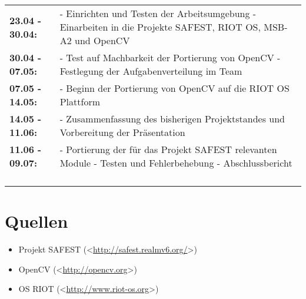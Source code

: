 \documentclass[10pt,a4paper]{article}
\begin{document}
\renewcommand{\arraystretch}{2}
\begin{tabularx}{\textwidth}{lX}
\textbf{23.04 - 30.04:} & 
- Einrichten und Testen der Arbeitsumgebung \newline
- Einarbeiten in die Projekte SAFEST, RIOT OS, MSB-A2 und OpenCV \\

\textbf{30.04 - 07.05:} & 
- Test auf Machbarkeit der Portierung von OpenCV \newline
- Festlegung der Aufgabenverteilung im Team \\

\textbf{07.05 - 14.05:} & 
- Beginn der Portierung von OpenCV auf die RIOT OS Plattform \\

\textbf{14.05 - 11.06:} & 
- Zusammenfassung des bisherigen Projektstandes und Vorbereitung der Präsentation \\

\textbf{11.06 - 09.07:} & 
- Portierung der für das Projekt SAFEST relevanten Module \newline
- Testen und Fehlerbehebung \newline
- Abschlussbericht \\ 
\\\\\\\\
\end{tabularx}


\section{Quellen}
\begin{itemize}
\item Projekt SAFEST (\textless\href{http://safest.realmv6.org/}{http://safest.realmv6.org/}\textgreater)
\item OpenCV (\textless\href{http://opencv.org}{http://opencv.org}\textgreater)
\item OS RIOT (\textless\href{http://www.riot-os.org}{http://www.riot-os.org}\textgreater)
\end{itemize}
\end{document}
